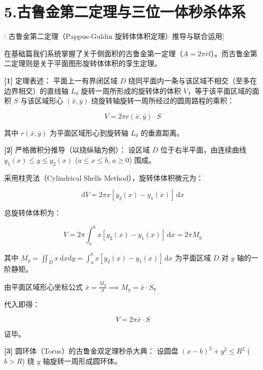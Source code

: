 \documentclass[11pt,a4paper,UTF8]{ctexart}
\begin{document}
\section{5.古鲁金第二定理与三位一体秒杀体系}

\begin{thmbox}[定理[2]: 古鲁金第二定理（Pappus-Guldin 旋转体体积定理）推导与联合运用]

在基础篇我们系统掌握了关于侧面积的古鲁金第一定理（$A = 2\pi \bar{r} l$）。而古鲁金第二定理则是关于平面图形旋转体体积的孪生定理。

\textbf{[1]} 定理表述：
平面上一有界闭区域 $D$ 绕同平面内一条与该区域不相交（至多在边界相交）的直线轴 $L_0$ 旋转一周所形成的旋转体的体积 $V$，等于该平面区域的面积 $S$ 与该区域形心 $(\bar{x}, \bar{y})$ 绕旋转轴旋转一周所经过的圆周路程的乘积：


\begin{equation*}
V = 2\pi r(\bar{x}, \bar{y}) \cdot S
\end{equation*}


其中 $r(\bar{x}, \bar{y})$ 为平面区域形心到旋转轴 $L_0$ 的垂直距离。

\textbf{[2]} 严格微积分推导（以绕纵轴为例）：
设区域 $D$ 位于右半平面，由连续曲线 $y_1(x) \leqslant y \leqslant y_2(x)$ ($a \leqslant x \leqslant b$, $a \geqslant 0$) 围成。

采用柱壳法（Cylindrical Shells Method），旋转体体积微元为：


\begin{equation*}
\mathrm{d}V = 2\pi x [y_2(x) - y_1(x)]\,\mathrm{d}x
\end{equation*}


总旋转体体积为：


\begin{equation*}
V = 2\pi \int_a^b x [y_2(x) - y_1(x)]\,\mathrm{d}x = 2\pi M_y
\end{equation*}


其中 $M_y = \iint_D x\,\mathrm{d}x\mathrm{d}y = \int_a^b x [y_2(x) - y_1(x)]\,\mathrm{d}x$ 为平面区域 $D$ 对 $y$ 轴的一阶静矩。

由平面区域形心坐标公式 $\bar{x} = \frac{M_y}{S} \implies M_y = \bar{x} \cdot S$。

代入即得：


\begin{equation*}
V = 2\pi \bar{x} \cdot S
\end{equation*}


证毕。

\textbf{[3]} 圆环体（Torus）的古鲁金双定理秒杀大典：
设圆盘 $(x - b)^2 + y^2 \leqslant R^2$ ($b > R$) 绕 $y$ 轴旋转一周形成圆环体。


\end{thmbox}
\end{document}
